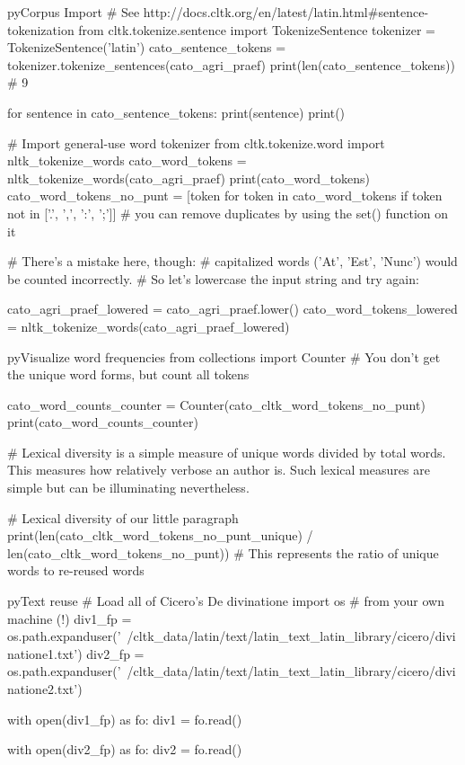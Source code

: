 \documentclass[10pt,a4paper]{article}
\begin{document}
\begin{multicols}{3}
\begin{codebox}{py}{Corpus Import}
# See http://docs.cltk.org/en/latest/latin.html#sentence-tokenization
from cltk.tokenize.sentence import TokenizeSentence
tokenizer = TokenizeSentence('latin')
cato_sentence_tokens = tokenizer.tokenize_sentences(cato_agri_praef)
print(len(cato_sentence_tokens)) # 9

for sentence in cato_sentence_tokens:
    print(sentence)
    print()

# Import general-use word tokenizer
from cltk.tokenize.word import nltk_tokenize_words
cato_word_tokens = nltk_tokenize_words(cato_agri_praef)
print(cato_word_tokens)
cato_word_tokens_no_punt = [token for token in cato_word_tokens if token not in ['.', ',', ':', ';']]
# you can remove duplicates by using the set() function on it

# There's a mistake here, though:
# capitalized words ('At', 'Est', 'Nunc') would be counted incorrectly.
# So let's lowercase the input string and try again:

cato_agri_praef_lowered = cato_agri_praef.lower()
cato_word_tokens_lowered = nltk_tokenize_words(cato_agri_praef_lowered)
\end{codebox}

\begin{codebox}{py}{Visualize word frequencies}
from collections import Counter
# You don't get the unique word forms, but count all tokens

cato_word_counts_counter = Counter(cato_cltk_word_tokens_no_punt)
print(cato_word_counts_counter)

# Lexical diversity is a simple measure of unique words divided by total words. This measures how relatively verbose an author is. Such lexical measures are simple but can be illuminating nevertheless. 

# Lexical diversity of our little paragraph
print(len(cato_cltk_word_tokens_no_punt_unique) / len(cato_cltk_word_tokens_no_punt))
# This represents the ratio of unique words to re-reused words
\end{codebox}

\begin{codebox}{py}{Text reuse}
# Load all of Cicero's De divinatione
import os
# from your own machine (!)
div1_fp = os.path.expanduser('~/cltk_data/latin/text/latin_text_latin_library/cicero/divinatione1.txt')
div2_fp = os.path.expanduser('~/cltk_data/latin/text/latin_text_latin_library/cicero/divinatione2.txt')

with open(div1_fp) as fo:
    div1 = fo.read()

with open(div2_fp) as fo:
    div2 = fo.read()


\end{codebox}
\end{multicols}
\end{document}
